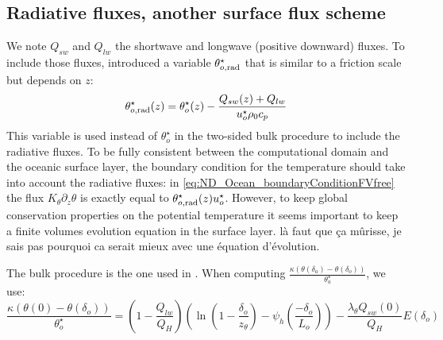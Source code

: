 \subsection{Radiative fluxes, another surface flux scheme}
\label{sec:ND_Ocean_radiativeFluxes}
We note $Q_{sw}$ and $Q_{lw}$ the shortwave and longwave (positive
downward) fluxes.
To include those fluxes, \cite{pelletier_two-sided_2021} introduced
a variable $\theta^\star_{o, \rm rad}$
that is similar to a friction scale but depends on $z$:
\begin{equation}
\theta^\star_{o, \rm rad}(z) =
	\theta^\star_{o}(z) -
	\frac{Q_{sw}(z) + Q_{lw}}{u^{\star}_o\rho_0 c_p}
\end{equation}
This variable is used instead of $\theta^\star_{o}$
in the two-sided bulk procedure to include the radiative fluxes.
To be fully consistent between the computational domain and
the oceanic surface layer, the boundary condition for the temperature
should take into account the radiative fluxes: in
\eqref{eq:ND_Ocean_boundaryConditionFVfree} the flux
$K_\theta \partial_z \theta$ is exactly equal to
$\theta^\star_{o, \rm rad}(z) u^\star_{o}$.
However, to keep global conservation properties on the potential
temperature it seems important to keep a finite volumes
evolution equation in the surface layer.
{\color{red} là faut que ça mûrisse,
je sais pas pourquoi ca serait mieux avec une équation d'évolution}.
%
\par
The bulk procedure is the one used in
\citep{pelletier_two-sided_2021}.
When computing
$\frac{\kappa (\theta(\delta_a) - \theta(\delta_o))}
	{\theta_a^{\star}}$,
	we use:
\begin{equation}
	\label{eq:ND_Ocean_skinbulk}
	\frac{\kappa (\theta(0) - \theta(\delta_o))}
	{\theta_o^{\star}} = (1 -
	\frac{Q_{lw}}{Q_H})
	\left(\ln (1 - \frac{\delta_o}{z_{\theta}}) -
	\psi_h(\frac{-\delta_o}{L_o})\right)
	- \frac{\lambda_\theta Q_{sw}(0)}
	{Q_H} E(\delta_o)
\end{equation}
